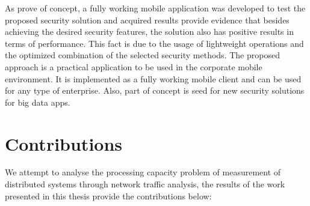 As prove of concept, a fully working mobile application was developed to test the proposed security solution and acquired results provide evidence that besides achieving the desired security features, the solution also has positive results in terms of performance. This fact is due to the usage of lightweight operations and the optimized combination of the selected security methods. The proposed approach is a practical application to be used in the corporate mobile environment. It is implemented as a fully working mobile client and can be used for any type of enterprise. Also, part of concept is seed for new security solutions for big data apps. 


\section{Contributions}
\label{sc:conc_contributions}

We attempt to analyse the processing capacity problem of measurement of distributed systems through network traffic analysis, the results of the work presented in this thesis provide the contributions below:

